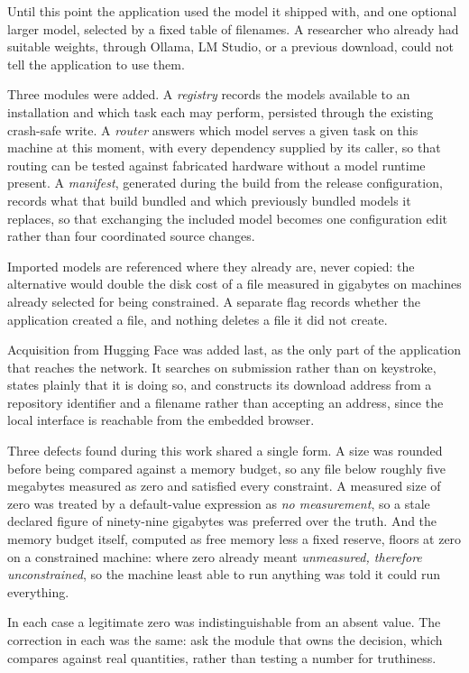 \documentclass[11pt,a4paper]{article}
\begin{document}
Until this point the application used the model it shipped with, and one
optional larger model, selected by a fixed table of filenames. A researcher who
already had suitable weights, through Ollama, LM Studio, or a previous
download, could not tell the application to use them.

Three modules were added. A \emph{registry} records the models available to an
installation and which task each may perform, persisted through the existing
crash-safe write. A \emph{router} answers which model serves a given task on
this machine at this moment, with every dependency supplied by its caller, so
that routing can be tested against fabricated hardware without a model runtime
present. A \emph{manifest}, generated during the build from the release
configuration, records what that build bundled and which previously bundled
models it replaces, so that exchanging the included model becomes one
configuration edit rather than four coordinated source changes.

Imported models are referenced where they already are, never copied: the
alternative would double the disk cost of a file measured in gigabytes on
machines already selected for being constrained. A separate flag records
whether the application created a file, and nothing deletes a file it did not
create.

Acquisition from Hugging Face was added last, as the only part of the
application that reaches the network. It searches on submission rather than on
keystroke, states plainly that it is doing so, and constructs its download
address from a repository identifier and a filename rather than accepting an
address, since the local interface is reachable from the embedded browser.

Three defects found during this work shared a single form. A size was rounded
before being compared against a memory budget, so any file below roughly five
megabytes measured as zero and satisfied every constraint. A measured size of
zero was treated by a default-value expression as \emph{no measurement}, so a
stale declared figure of ninety-nine gigabytes was preferred over the truth.
And the memory budget itself, computed as free memory less a fixed reserve,
floors at zero on a constrained machine: where zero already meant
\emph{unmeasured, therefore unconstrained}, so the machine least able to run
anything was told it could run everything.

In each case a legitimate zero was indistinguishable from an absent value. The
correction in each was the same: ask the module that owns the decision, which
compares against real quantities, rather than testing a number for truthiness.
\end{document}
